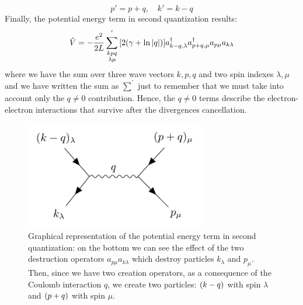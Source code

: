 \documentclass[11pt, a4paper, twoside, openright]{article}
\begin{document}
\begin{itemize}
\begin{itemize}
\begin{equation*}
  p' = p + q, \quad k' = k - q
\end{equation*}
Finally, the potential energy term in second quantization results:
\begin{equation}
  \hat{V} = - \frac{e^2}{2L} \sum_{\substack{k p q \\ \lambda \mu  } }^{'} \qty[  2 \qty( \gamma + \ln{\abs{q } }  ) ]
  a_{k-q, \lambda } ^\dag a_{p+q,\mu }^\dag  a_{p\mu } a_{k \lambda }
\end{equation}
where we have the sum over three wave vectors \( k,p,q \) and two spin indexes \( \lambda ,\mu  \) and we have written the sum as \( \sum_{}^{'}   \) just to remember that we must take into account only the \( q \neq 0 \) contribution.
Hence, the \( q \neq 0 \) terms describe the electron-electron interactions that survive after the divergences cancellation.

\begin{figure}[h!]
\begin{minipage}[c]{0.57\textwidth}
  \hspace{1.5cm}
    \includegraphics[width=0.7\textwidth]{feyman.pdf}
  \end{minipage}
  \begin{minipage}[c]{0.4\textwidth}
    \caption{\label{fig:4_3} Graphical representation of the potential energy term in second quantization: on the bottom we can see the effect of the two destruction operators \(  a_{p \mu } a_{k\lambda } \) which destroy particles \( k_ \lambda  \) and \( p_ \mu  \).
    Then, since we have two creation operators, as  a consequence of the Coulomb interaction \( q \), we create two particles:  \( \qty(k-q)  \) with spin \( \lambda  \)  and \( \qty(p+q)  \) with spin \( \mu  \).
    }
  \end{minipage}
\end{figure}


\end{itemize}





\end{itemize}
\end{document}
